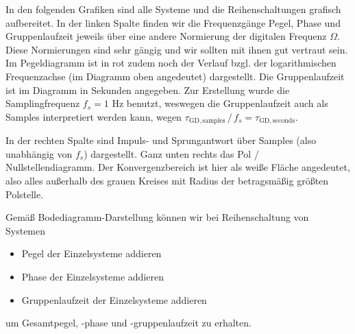 \begin{Loesung}
\begin{center}
\end{center}

In den folgenden Grafiken sind alle Systeme und die Reihenschaltungen
grafisch aufbereitet.
In der linken Spalte finden wir die Frequenzgänge Pegel, Phase und Gruppenlaufzeit
jeweils über eine andere Normierung der digitalen Frequenz $\Omega$.
Diese Normierungen sind sehr gängig und wir sollten mit ihnen gut vertraut sein.
Im Pegeldiagramm ist in rot zudem noch der Verlauf bzgl. der logarithmischen
Frequenzachse (im Diagramm oben angedeutet) dargestellt.
Die Gruppenlaufzeit ist im Diagramm in Sekunden angegeben. Zur Erstellung
wurde die Samplingfrequenz $f_s=1$ Hz benutzt, weswegen
die Gruppenlaufzeit auch als Samples interpretiert werden kann, wegen
$\tau_\mathrm{GD,samples} \,/\, f_s = \tau_\mathrm{GD,seconds}$.

In der rechten Spalte sind Impuls- und Sprungantwort über Samples (also unabhängig
von $f_s$) dargestellt. Ganz unten rechts das Pol / Nullstellendiagramm.
Der Konvergenzbereich ist hier als weiße Fläche angedeutet, also alles außerhalb
des grauen Kreises mit Radius der betragsmäßig größten Polstelle.

Gemäß Bodediagramm-Darstellung können wir bei Reihenschaltung von Systemen
\begin{itemize}
  \item Pegel der Einzelsysteme addieren
  \item Phase der Einzelsysteme addieren
  \item Gruppenlaufzeit der Einzelsysteme addieren
\end{itemize}
um Gesamtpegel, -phase und -gruppenlaufzeit zu erhalten.


\end{Loesung}
